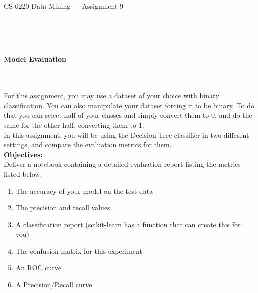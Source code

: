 \documentclass[letter-paper,12pt]{article} %
\begin{document}

\begin{center}
\begin{Huge}
CS 6220 Data Mining --- Assignment 9
\end{Huge}
\end{center}

\hline
\hline
~\\~\\~\\

\begin{center}
\begin{Large}
\textbf{Model Evaluation}
\end{Large}
\end{center}
~\\~\\

For this assignment, you may use a dataset of your choice with binary classification. You can also manipulate your dataset forcing it to be binary. To do that you can select half of your classes and simply convert them to 0, and do the same for the other half, converting them to 1.\\

In this assignment, you will be using the Decision Tree classifier in two different settings, and compare the evaluation metrics for them. \\

\textbf{Objectives:}\\

Deliver a notebook containing a detailed evaluation report listing the metrics listed below.

\begin{enumerate}
\item The accuracy of your model on the test data
\item The precision and recall values
\item A classification report (scikit-learn has a function that can create this for you)
\item The confusion matrix for this experiment
\item An ROC curve
\item A Precision/Recall curve
\end{enumerate}
~\\
\end{document}
